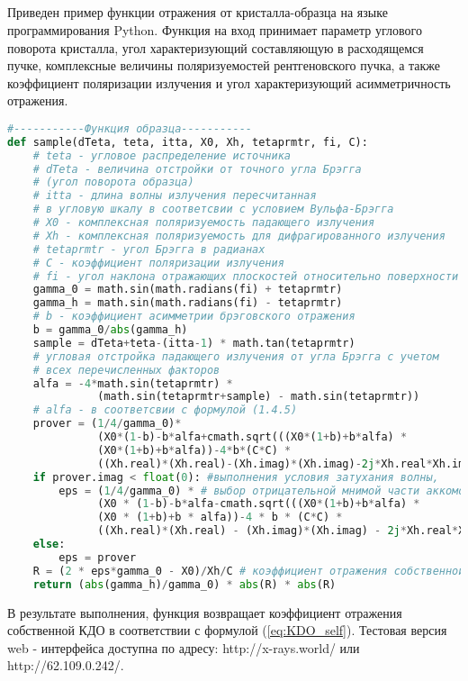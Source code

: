 
\newpage
  \begin{center}
  \section{ }%
  \label{sec:sample_functions}
  \end{center}
Приведен пример функции отражения от кристалла-образца на
языке программирования Python. Функция на вход принимает
параметр углового поворота кристалла, угол характеризующий
составляющую в расходящемся пучке, комплексные величины поляризуемостей
 рентгеновского пучка, а также коэффициент поляризации излучения и угол
 характеризующий асимметричность отражения.

{\scriptsize
\begin{lstlisting}[language=Python]
#-----------Функция образца-----------
def sample(dTeta, teta, itta, X0, Xh, tetaprmtr, fi, C):
    # teta - угловое распределение источника
    # dTeta - величина отстройки от точного угла Брэгга
    # (угол поворота образца)
    # itta - длина волны излучения пересчитанная
    # в угловую шкалу в соответсвии с условием Вульфа-Брэгга
    # X0 - комплексная поляризуемость падающего излучения
    # Xh - комплексная поляризуемость для дифрагированного излучения
    # tetaprmtr - угол Брэгга в радианах
    # C - коэффициент поляризации излучения
    # fi - угол наклона отражающих плоскостей относительно поверхности
    gamma_0 = math.sin(math.radians(fi) + tetaprmtr)
    gamma_h = math.sin(math.radians(fi) - tetaprmtr)
    # b - коэффициент асимметрии брэговского отражения
    b = gamma_0/abs(gamma_h)
    sample = dTeta+teta-(itta-1) * math.tan(tetaprmtr)
    # угловая отстройка падающего излучения от угла Брэгга с учетом
    # всех перечисленных факторов 
    alfa = -4*math.sin(tetaprmtr) *
              (math.sin(tetaprmtr+sample) - math.sin(tetaprmtr))
    # alfa - в соответсвии с формулой (1.4.5)
    prover = (1/4/gamma_0)*
              (X0*(1-b)-b*alfa+cmath.sqrt(((X0*(1+b)+b*alfa) *
              (X0*(1+b)+b*alfa))-4*b*(C*C) *
              ((Xh.real)*(Xh.real)-(Xh.imag)*(Xh.imag)-2j*Xh.real*Xh.imag)))
    if prover.imag < float(0): #выполнения условия затухания волны,
        eps = (1/4/gamma_0) * # выбор отрицательной мнимой части аккомодации
              (X0 * (1-b)-b*alfa-cmath.sqrt(((X0*(1+b)+b*alfa) *
              (X0 * (1+b)+b * alfa))-4 * b * (C*C) *
              ((Xh.real)*(Xh.real) - (Xh.imag)*(Xh.imag) - 2j*Xh.real*Xh.imag)))
    else:
        eps = prover
    R = (2 * eps*gamma_0 - X0)/Xh/C # коэффициент отражения собственной КДО
    return (abs(gamma_h)/gamma_0) * abs(R) * abs(R)
\end{lstlisting}
}
В результате выполнения, функция возвращает коэффициент отражения собственной КДО в
соответствии с формулой (\ref{eq:KDO_self}). Тестовая версия web - интерфейса
доступна по адресу: http://x-rays.world/ или http://62.109.0.242/.
